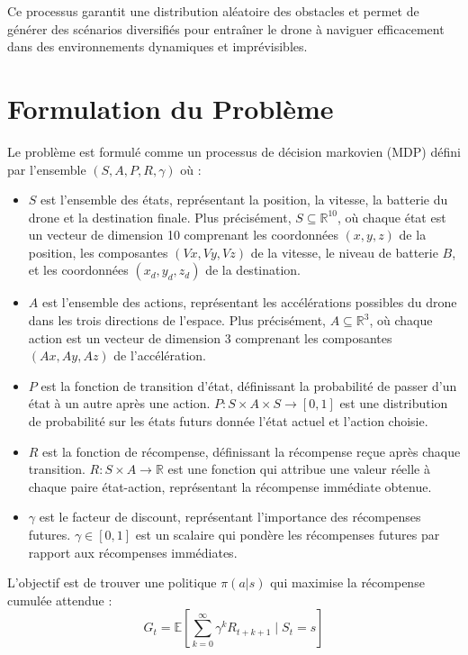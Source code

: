 \documentclass[a4paper, 12pt]{article}
\begin{document}
Ce processus garantit une distribution aléatoire des obstacles et permet de générer des scénarios diversifiés pour entraîner le drone à naviguer efficacement dans des environnements dynamiques et imprévisibles.

\section{Formulation du Problème}
Le problème est formulé comme un processus de décision markovien (MDP) défini par l'ensemble $(S, A, P, R, \gamma)$ où :
\begin{itemize}
    \item $S$ est l'ensemble des états, représentant la position, la vitesse, la batterie du drone et la destination finale. Plus précisément, $S \subseteq \mathbb{R}^{10}$, où chaque état est un vecteur de dimension 10 comprenant les coordonnées $(x, y, z)$ de la position, les composantes $(Vx, Vy, Vz)$ de la vitesse, le niveau de batterie $B$, et les coordonnées $(x_d, y_d, z_d)$ de la destination.
    \item $A$ est l'ensemble des actions, représentant les accélérations possibles du drone dans les trois directions de l'espace. Plus précisément, $A \subseteq \mathbb{R}^3$, où chaque action est un vecteur de dimension 3 comprenant les composantes $(Ax, Ay, Az)$ de l'accélération.
    \item $P$ est la fonction de transition d'état, définissant la probabilité de passer d'un état à un autre après une action. $P : S \times A \times S \rightarrow [0, 1]$ est une distribution de probabilité sur les états futurs donnée l'état actuel et l'action choisie.
    \item $R$ est la fonction de récompense, définissant la récompense reçue après chaque transition. $R : S \times A \rightarrow \mathbb{R}$ est une fonction qui attribue une valeur réelle à chaque paire état-action, représentant la récompense immédiate obtenue.
    \item $\gamma$ est le facteur de discount, représentant l'importance des récompenses futures. $\gamma \in [0, 1]$ est un scalaire qui pondère les récompenses futures par rapport aux récompenses immédiates.
\end{itemize}

L'objectif est de trouver une politique $\pi(a|s)$ qui maximise la récompense cumulée attendue :
\[
G_t = \mathbb{E} \left[ \sum_{k=0}^{\infty} \gamma^k R_{t+k+1} \mid S_t = s \right]
\]
\end{document}
